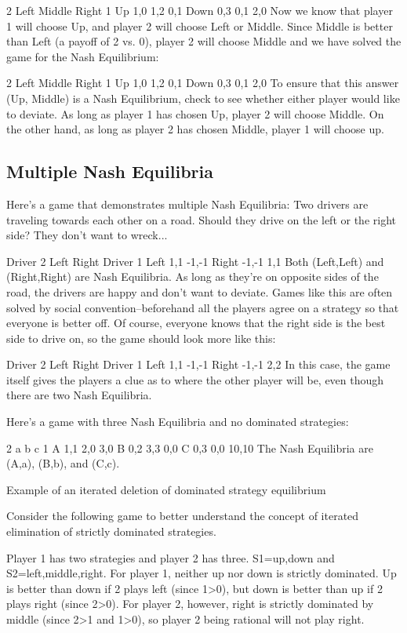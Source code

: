 2
Left	Middle	Right
1	Up	1,0	1,2	0,1
Down	0,3	0,1	2,0
Now we know that player 1 will choose Up, and player 2 will choose Left or Middle. Since Middle is better than Left (a payoff of 2 vs. 0), player 2 will choose Middle and we have solved the game for the Nash Equilibrium:

2
Left	Middle	Right
1	Up	1,0	1,2	0,1
Down	0,3	0,1	2,0
To ensure that this answer (Up, Middle) is a Nash Equilibrium, check to see whether either player would like to deviate. As long as player 1 has chosen Up, player 2 will choose Middle. On the other hand, as long as player 2 has chosen Middle, player 1 will choose up.

\subsection{Multiple Nash Equilibria}

Here's a game that demonstrates multiple Nash Equilibria: Two drivers are traveling towards each other on a road. Should they drive on the left or the right side? They don't want to wreck...

Driver 2
Left	Right
Driver 1	Left	1,1	-1,-1
Right	-1,-1	1,1
Both (Left,Left) and (Right,Right) are Nash Equilibria. As long as they're on opposite sides of the road, the drivers are happy and don't want to deviate. Games like this are often solved by social convention--beforehand all the players agree on a strategy so that everyone is better off. Of course, everyone knows that the right side is the best side to drive on, so the game should look more like this:

Driver 2
Left	Right
Driver 1	Left	1,1	-1,-1
Right	-1,-1	2,2
In this case, the game itself gives the players a clue as to where the other player will be, even though there are two Nash Equilibria.

Here's a game with three Nash Equilibria and no dominated strategies:

2
a	b	c
1	A	1,1	2,0	3,0
B	0,2	3,3	0,0
C	0,3	0,0	10,10
The Nash Equilibria are (A,a), (B,b), and (C,c).


Example of an iterated deletion of dominated strategy equilibrium

Consider the following game to better understand the concept of iterated elimination of strictly dominated strategies.


Player 1 has two strategies and player 2 has three. S1={up,down} and S2={left,middle,right}. For player 1, neither up nor down is strictly dominated. Up is better than down if 2 plays left (since 1>0), but down is better than up if 2 plays right (since 2>0). For player 2, however, right is strictly dominated by middle (since 2>1 and 1>0), so player 2 being rational will not play right.

